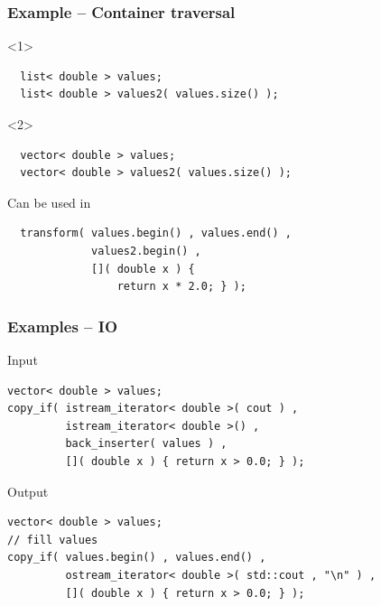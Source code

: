 \documentclass{beamer}
\newcommand{\heading}[1]{\frametitle{#1}}
\begin{document}
\begin{frame}[fragile]
 \heading{Example -- Container traversal}
 \begin{onlyenv}<1>
 \begin{lstlisting}
  list< double > values;
  list< double > values2( values.size() );
 \end{lstlisting}
 \end{onlyenv}
 \begin{onlyenv}<2>
 \begin{lstlisting}
  vector< double > values;
  vector< double > values2( values.size() );
 \end{lstlisting}
 \end{onlyenv} 
 \vspace{2ex}
 Can be used in
 \begin{lstlisting}
  transform( values.begin() , values.end() ,
             values2.begin() ,
             []( double x ) {
                 return x * 2.0; } );
 \end{lstlisting}
\end{frame}




\begin{frame}[fragile]
  \heading{Examples -- IO}

Input
\begin{lstlisting}[basicstyle=\scriptsize\ttfamily]
vector< double > values;  
copy_if( istream_iterator< double >( cout ) ,
         istream_iterator< double >() ,
         back_inserter( values ) ,
         []( double x ) { return x > 0.0; } );
\end{lstlisting}
\vspace{2ex}
Output
\begin{lstlisting}[basicstyle=\scriptsize\ttfamily]
vector< double > values;  
// fill values
copy_if( values.begin() , values.end() ,
         ostream_iterator< double >( std::cout , "\n" ) ,
         []( double x ) { return x > 0.0; } );
\end{lstlisting}

\end{frame}
\end{document}
